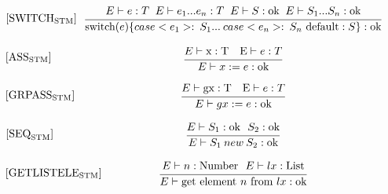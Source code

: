 \begin{equation}
\begin{minipage}{.2\linewidth}
$[\text{SWITCH}_\text{STM}]$
\end{minipage}
\begin{minipage}{.8\linewidth}
\centering
$\cfrac{E \vdash e : T \; \; E \vdash e_1 ... e_n : T \; \; E \vdash S : \text{ok} \; \; E \vdash S_1 ... S_n : \text{ok}}{\text{switch}(e) \{case <e_1>: \: S_1 ... \: case <e_n>: \: S_n \text{ default}: S \} : \text{ok}}$
\end{minipage}
\end{equation}

\begin{equation}
\begin{minipage}{.2\linewidth}
$[\text{ASS}_\text{STM}]$
\end{minipage}
\begin{minipage}{.8\linewidth}
\centering
$\cfrac{E \vdash \text{x} : \text{T} \: \: \: \text{ E} \vdash e : T} {E \vdash x := e : \text{ok} }$
\end{minipage}
\end{equation}

\begin{equation}
\begin{minipage}{.2\linewidth}
$[\text{GRPASS}_\text{STM}]$
\end{minipage}
\begin{minipage}{.8\linewidth}
\centering
$\cfrac{E \vdash \text{gx} : \text{T} \: \: \: \text{ E} \vdash e : T} {E \vdash gx := e : \text{ok} }$
\end{minipage}
\end{equation}

\begin{equation}
\begin{minipage}{.2\linewidth}
$[\text{SEQ}_\text{STM}]$
\end{minipage}
\begin{minipage}{.8\linewidth}
\centering
$\cfrac{E \vdash S_1 : \text{ok} \: \: \: S_2 : \text{ok}} {E \vdash S_1 \: new \: S_2 : \text{ok} }$
\end{minipage}
\end{equation}

\begin{equation}
\begin{minipage}{.2\linewidth}
$[\text{GETLISTELE}_\text{STM}]$
\end{minipage}
\begin{minipage}{.8\linewidth}
\centering
$\cfrac{E \vdash n : \text{Number} \: \: \: E \vdash lx : \text{List}} {E \vdash \text{get element } n \text{ from } lx: \text{ok} }$
\end{minipage}
\end{equation}

